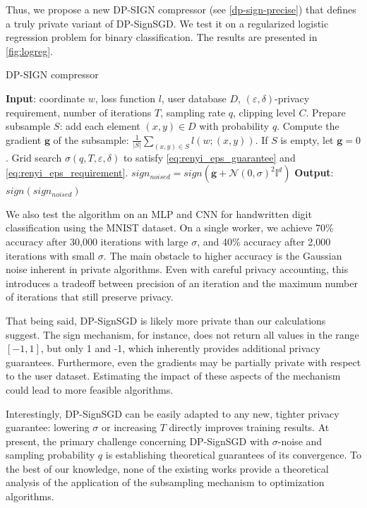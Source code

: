 \documentclass[a4paper, 12pt]{article}
\newcommand{\eps}{\varepsilon}
\begin{document}
Thus, we propose a new DP-SIGN compressor (see \cref{dp-sign-precise}) that defines a truly private variant of DP-SignSGD. We test it on a regularized logistic regression problem for binary classification. The results are presented in \cref{fig:logreg}.


\newcommand{\gradg}{\boldsymbol{g}}
\begin{algorithm}
    \caption{DP-SIGN compressor}
    \label{dp-sign-precise}
    \begin{algorithmic}
        \STATE \textbf{Input}: coordinate $w$, loss function $l$, user database $D$, $(\eps, \delta)$-privacy requirement, number of iterations $T$, sampling rate $q$, clipping level $C$.
        \STATE Prepare subsample $S$: add each element $(x, y) \in D$ with probability $q$.
        \STATE Compute the gradient $\gradg$ of the subsample: $\frac{1}{|S|}\sum_{(x,y)\in S}l(w;(x,y))$. If $S$ is empty, let $\gradg = 0$.
        \STATE Grid search $\sigma(q, T, \eps, \delta)$ to satisfy \eqref{eq:renyi_eps_guarantee} and \eqref{eq:renyi_eps_requirement}.
        \STATE $sign_{noised} = sign(\gradg + \mathcal{N}(0,\sigma)^2\mathbb{I}^d)$
        \STATE \textbf{Output}: $sign(sign_{noised})$
    \end{algorithmic}
\end{algorithm}

We also test the algorithm on an MLP and CNN for handwritten digit classification using the MNIST dataset. On a single worker, we achieve 70\% accuracy after 30,000 iterations with large $\sigma$, and 40\% accuracy after 2,000 iterations with small $\sigma$. The main obstacle to higher accuracy is the Gaussian noise inherent in private algorithms. Even with careful privacy accounting, this introduces a tradeoff between precision of an iteration and the maximum number of iterations that still preserve privacy.

That being said, DP-SignSGD is likely more private than our calculations suggest. The sign mechanism, for instance, does not return all values in the range $[-1,1]$, but only 1 and -1, which inherently provides additional privacy guarantees. Furthermore, even the gradients may be partially private with respect to the user dataset. Estimating the impact of these aspects of the mechanism could lead to more feasible algorithms.

Interestingly, DP-SignSGD can be easily adapted to any new, tighter privacy guarantee: lowering $\sigma$ or increasing $T$ directly improves training results. At present, the primary challenge concerning DP-SignSGD with $\sigma$-noise and sampling probability $q$ is establishing theoretical guarantees of its convergence. To the best of our knowledge, none of the existing works provide a theoretical analysis of the application of the subsampling mechanism to optimization algorithms.

\vspace{-2em}
\printbibliography[heading=bibliography]
\end{document}
